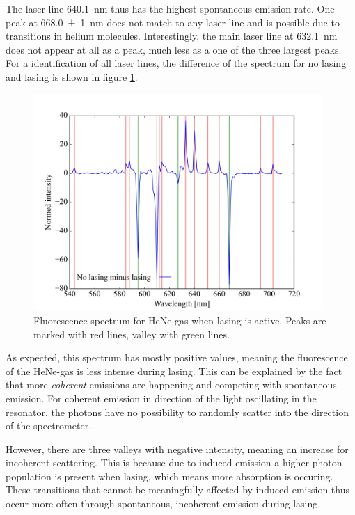 \documentclass[../main.tex]{subfiles}
\begin{document}
     \noindent The laser line \SI{640.1}{\nm} thus has the highest spontaneous emission rate. One peak at \SI{668.0(10)}{\nm} does not match to any laser line and is possible due to transitions in helium molecules. Interestingly, the main laser line at \SI{632.1}{\nm} does not appear at all as a peak, much less as a one of the three largest peaks.\\

     \noindent For a identification of all laser lines, the difference of the spectrum for no lasing and lasing is shown in figure \ref{fig:5-NeonspektrumDifferenz}.

     \begin{figure}[H]
        \centering 
        \includegraphics[width = 11cm]{Bilddateien/5/5-NeonspektrumDifferenz.jpg}
        \caption{Fluorescence spectrum for HeNe-gas when lasing is active. Peaks are marked with red lines, valley with green lines.}
        \label{fig:5-NeonspektrumDifferenz}
    \end{figure}

    \noindent As expected, this spectrum has mostly positive values, meaning the fluorescence of the HeNe-gas is less intense during lasing. This can be explained by the fact that more \textit{coherent} emissions are happening and competing with spontaneous emission. For coherent emission in direction of the light oscillating in the resonator, the photons have no possibility to randomly scatter into the direction of the spectrometer. 
    
    However, there are three valleys with negative intensity, meaning an increase for incoherent scattering. This is because due to induced emission a higher photon population is present when lasing, which means more absorption is occuring. These transitions that cannot be meaningfully affected by induced emission thus occur more often through spontaneous, incoherent emission during lasing.\\
    
\end{document}
